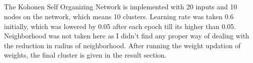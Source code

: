 \documentclass{article}
\begin{document}
    \subsection{}

    \noindent The Kohonen Self Organizing Network is implemented with 20 inputs and 10 nodes on the network, which means 10 clusters. Learning rate was taken 0.6 initially, which was lowered by 0.05 after each epoch till its higher than 0.05. Neighborhood was not taken here as I didn't find any proper way of dealing with the reduction in radius of neighborhood. After running the weight updation of weights, the final cluster is given in the result section. 


\newpage

\section{}
\end{document}
